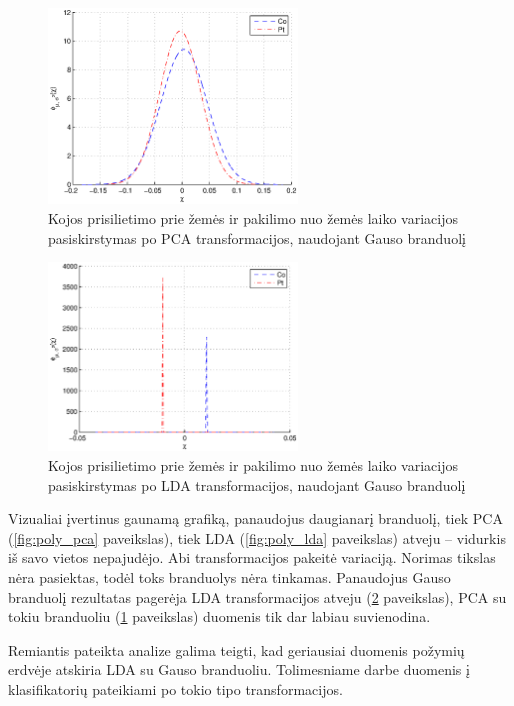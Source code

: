 \documentclass[]{vgtuef}
\begin{document}
\begin{figure}[!t]
  \centering
  \includegraphics[width=250px]{figures/st_sw_gauss_kpca.eps}
  \caption{Kojos prisilietimo prie žemės ir pakilimo nuo žemės laiko variacijos pasiskirstymas po PCA transformacijos, naudojant Gauso branduolį}
  \label{fig:gauss_pca}
\end{figure}

\begin{figure}[!t]
  \centering
  \includegraphics[width=250px]{figures/st_sw_gauss_gda.eps}
  \caption{Kojos prisilietimo prie žemės ir pakilimo nuo žemės laiko variacijos pasiskirstymas po LDA transformacijos, naudojant Gauso branduolį}
  \label{fig:gauss_lda}
\end{figure}

Vizualiai įvertinus gaunamą grafiką, panaudojus daugianarį branduolį, tiek PCA (\ref{fig:poly_pca} paveikslas), tiek LDA (\ref{fig:poly_lda} paveikslas) atveju -- vidurkis iš savo vietos nepajudėjo. Abi transformacijos pakeitė variaciją. Norimas tikslas nėra pasiektas, todėl toks branduolys nėra tinkamas. Panaudojus Gauso branduolį rezultatas pagerėja LDA transformacijos atveju (\ref{fig:gauss_lda} paveikslas), PCA su tokiu branduoliu (\ref{fig:gauss_pca} paveikslas) duomenis tik dar labiau suvienodina.

Remiantis pateikta analize galima teigti, kad geriausiai duomenis požymių erdvėje atskiria LDA su Gauso branduoliu. Tolimesniame darbe duomenis į klasifikatorių pateikiami po tokio tipo transformacijos.
\end{document}
